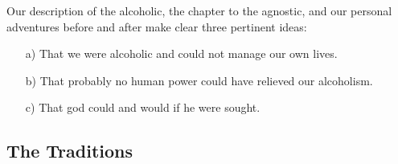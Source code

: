 \documentclass{beamer}
\begin{document}
\begin{frame}
Our  description  of  the  alcoholic,  the  chapter  to  the  agnostic,  and our personal adventures before and after make clear three pertinent ideas: 
\smallskip
\begin{itemize}
\item[a)] That  we  were  alcoholic  and  could  not  manage  our  own  lives.
\item[b)] That probably no human power could have relieved our alcoholism. 
\item[c)] That god could and would if he were sought. 
\end{itemize}
\end{frame}

\subsection{The Traditions}
\end{document}
